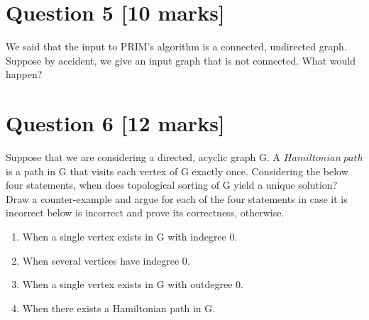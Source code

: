 \documentclass[11pt]{article}
\begin{document}
\section*{Question 5 [10 marks]}
We said that the input to PRIM’s algorithm is a connected, undirected graph. Suppose by accident, we give an input graph that is not connected. What would happen?

\section*{Question 6 [12 marks]}

Suppose that we are considering a directed, acyclic graph G. A  $Hamiltonian \ path$ is a path in G that visits each vertex of G exactly once. Considering the below four statements, when  does  topological sorting of  G yield a unique solution? Draw a counter-example and argue for each of the four statements  in case it is incorrect below is incorrect and prove  its correctness, otherwise.

\begin{enumerate}
	\item When a single vertex exists in G with  indegree 0.
	\item When several vertices have indegree 0.
	\item When a single vertex exists in G with  outdegree 0.
	\item When there  exists a Hamiltonian path in G.
	
	
\end{enumerate}

\begin{center}
\end{center}
\end{document}
